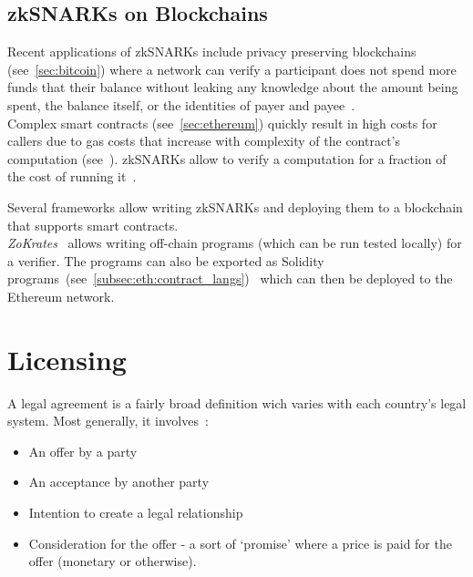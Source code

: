 \subsection{zkSNARKs on Blockchains}\label{subsec:onchain-snarks}

Recent applications of zkSNARKs include privacy preserving blockchains (see~\ref{sec:bitcoin}) where a network can
verify a participant does not spend more funds that their balance without leaking any knowledge about the amount being
spent, the balance itself, or the identities of payer and payee~\cite{zerocash_whitepaper}.\\

Complex smart contracts (see~\ref{sec:ethereum}) quickly result in high costs for callers due to gas costs that increase with complexity of the
contract's computation (see~).
zkSNARKs allow to verify a computation for a fraction of the cost of running it~\cite{zokrates_intro}.

Several frameworks allow writing zkSNARKs and deploying them to a blockchain that supports smart contracts.\\

\textit{ZoKrates}~\cite{zokrates_repo} allows writing off-chain programs (which can be run tested locally) for a
verifier.
The programs can also be exported as Solidity programs~(see~\ref{subsec:eth:contract_langs})~\cite{solidity_repo} which
can then be deployed to the Ethereum network.



\section{Licensing}\label{sec:licensing}

A legal agreement is a fairly broad definition wich varies with each country's legal system.
Most generally, it involves~\cite{contractDef2018precedent}:
\begin{itemize}
    \item An offer by a party
    \item An acceptance by another party
    \item Intention to create a legal relationship
    \item Consideration for the offer - a sort of `promise' where a price is paid for the offer (monetary or
    otherwise).
\end{itemize}

